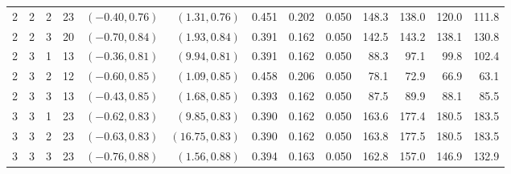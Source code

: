 \documentclass{article}
\numberwithin{equation}{section}
\theoremstyle{plain}
\begin{document}
\begin{sidewaystable}[htbp]
\begin{center}
\begin{tabular}{rrrrrrrrrrrrr}
			2 & 2 & 2 & 23 & $(-0.40, 0.76)$ & $(1.31, 0.76)$ & 0.451 & 0.202 & 0.050 & 148.3 & 138.0 & 120.0 & 111.8 \\
			2 & 2 & 3 & 20 & $(-0.70, 0.84)$ & $(1.93, 0.84)$ & 0.391 & 0.162 & 0.050 & 142.5 & 143.2 & 138.1 & 130.8 \\
			2 & 3 & 1 & 13 & $(-0.36, 0.81)$ & $(9.94, 0.81)$ & 0.391 & 0.162 & 0.050 & 88.3 & 97.1 & 99.8 & 102.4 \\
			2 & 3 & 2 & 12 & $(-0.60, 0.85)$ & $(1.09, 0.85)$ & 0.458 & 0.206 & 0.050 & 78.1 & 72.9 & 66.9 & 63.1 \\
			2 & 3 & 3 & 13 & $(-0.43, 0.85)$ & $(1.68, 0.85)$ & 0.393 & 0.162 & 0.050 & 87.5 & 89.9 & 88.1 & 85.5 \\
			3 & 3 & 1 & 23 & $(-0.62, 0.83)$ & $(9.85, 0.83)$ & 0.390 & 0.162 & 0.050 & 163.6 & 177.4 & 180.5 & 183.5 \\
			3 & 3 & 2 & 23 & $(-0.63, 0.83)$ & $(16.75, 0.83)$ & 0.390 & 0.162 & 0.050 & 163.8 & 177.5 & 180.5 & 183.5 \\
			3 & 3 & 3 & 23 & $(-0.76, 0.88)$ & $(1.56, 0.88)$ & 0.394 & 0.163 & 0.050 & 162.8 & 157.0 & 146.9 & 132.9 \\
			\hline
		\end{tabular}
	\end{center}
\end{sidewaystable}
\end{document}
